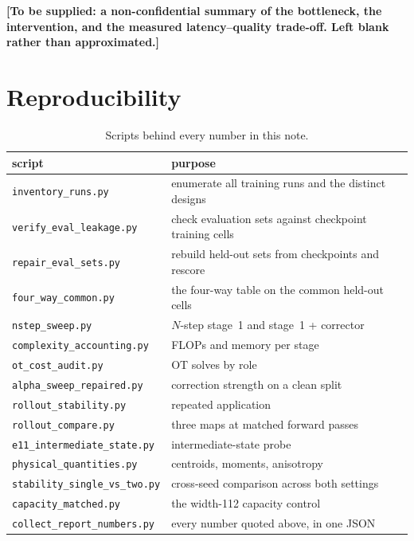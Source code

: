 ﻿\documentclass[11pt,a4paper]{article}
\newcommand{\TODO}[1]{\textcolor{red!70!black}{\textbf{[#1]}}}
\begin{document}
\TODO{To be supplied: a non-confidential summary of the bottleneck, the intervention, and the
measured latency--quality trade-off. Left blank rather than approximated.}

\appendix
\section{Reproducibility}

\begin{table}[h]
\centering\small
\begin{tabular}{@{}ll@{}}
\toprule
script & purpose \\
\midrule
\texttt{inventory\_runs.py} & enumerate all training runs and the distinct designs \\
\texttt{verify\_eval\_leakage.py} & check evaluation sets against checkpoint training cells \\
\texttt{repair\_eval\_sets.py} & rebuild held-out sets from checkpoints and rescore \\
\texttt{four\_way\_common.py} & the four-way table on the common held-out cells \\
\texttt{nstep\_sweep.py} & $N$-step stage~1 and stage~1 + corrector \\
\texttt{complexity\_accounting.py} & FLOPs and memory per stage \\
\texttt{ot\_cost\_audit.py} & OT solves by role \\
\texttt{alpha\_sweep\_repaired.py} & correction strength on a clean split \\
\texttt{rollout\_stability.py} & repeated application \\
\texttt{rollout\_compare.py} & three maps at matched forward passes \\
\texttt{e11\_intermediate\_state.py} & intermediate-state probe \\
\texttt{physical\_quantities.py} & centroids, moments, anisotropy \\
\texttt{stability\_single\_vs\_two.py} & cross-seed comparison across both settings \\
\texttt{capacity\_matched.py} & the width-112 capacity control \\
\texttt{collect\_report\_numbers.py} & every number quoted above, in one JSON \\
\bottomrule
\end{tabular}
\caption{Scripts behind every number in this note.}
\end{table}
\end{document}
